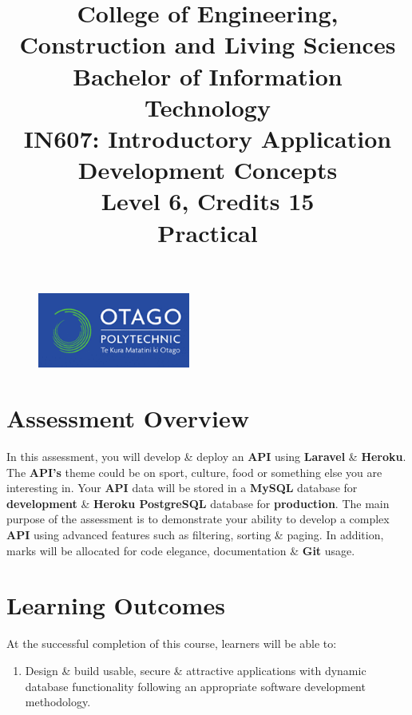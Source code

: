 \documentclass{article}
\author{}
\begin{document}
\begin{figure}
	\centering
	\includegraphics[width=50mm]{./img/logo.png}
\end{figure}

\title{College of Engineering, Construction and Living Sciences\\Bachelor of Information Technology\\IN607: Introductory Application Development Concepts\\Level 6, Credits 15\\\textbf{Practical}}
\date{}
\maketitle

\section*{Assessment Overview}
In this assessment, you will develop \& deploy an \textbf{API} using \textbf{Laravel} \& \textbf{Heroku}. The \textbf{API's} theme could be on sport, culture, food or something else you are interesting in. Your \textbf{API} data will be stored in a \textbf{MySQL} database for \textbf{development} \& \textbf{Heroku PostgreSQL} database for \textbf{production}. The main purpose of the assessment is to demonstrate your ability to develop a complex \textbf{API} using advanced features such as filtering, sorting \& paging. In addition, marks will be allocated for code elegance, documentation \& \textbf{Git} usage. 

\section*{Learning Outcomes}
At the successful completion of this course, learners will be able to:
\begin{enumerate}
	\item Design \& build usable, secure \& attractive applications with dynamic database functionality following an appropriate software development methodology.
\end{enumerate}
\end{document}
